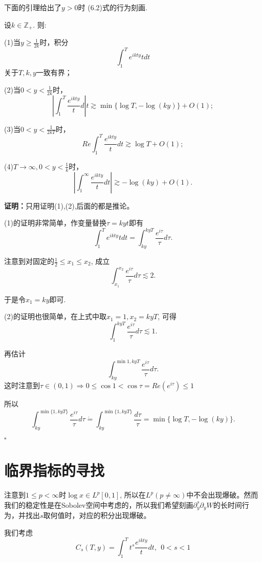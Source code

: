 下面的引理给出了$y>0$时 (6.2)式的行为刻画.

\begin{lem}
\songti\rm 设$k\in\mathbb{Z}_+$. 则:

(1)当$y\geq \frac{1}{2k}$时，积分$$\int_1^T e^{ikty}{t}dt$$关于$T,k,y$一致有界；

(2)当$0<y<\frac{1}{2k}$时，$$\left|\int_1^T\frac{e^{ikty}}{t}d\right|t\gtrsim\min\{\log T,-\log(ky)\}+O(1);$$

(3)当$0<y<\frac{1}{2kT}$时，$$Re\int_1^T\frac{e^{ikty}}{t} dt\gtrsim \log T+O(1);$$

(4)$T\rightarrow\infty,0<y<\frac{1}{k}$时，$$\left|\int_1^\infty\frac{e^{ikty}}{t}dt\right|\gtrsim-\log(ky)+O(1).$$
\end{lem}

\textbf{证明：}只用证明(1),(2),后面的都是推论。

(1)的证明非常简单，作变量替换$\tau=kyt$即有$$\int_1^T e^{ikty}{t}dt=\int_{ky}^{kyT}\frac{e^{i\tau}}{\tau}d\tau.$$

注意到对固定的$\frac{1}{2}\leq x_1\leq x_2$, 成立$$\int_{x_1}^{x_2}\frac{e^{i\tau}}{\tau}d\tau\lesssim 2.$$

于是令$x_1=ky$即可.

(2)的证明也很简单，在上式中取$x_1=1,x_2=kyT$, 可得$$\int_1^{kyT}\frac{e^{i\tau}}{\tau}d\tau\lesssim 1.$$

再估计$$\int_{ky}^{\min{1,kyT}}\frac{e^{i\tau}}{\tau}d\tau.$$这时注意到$\tau\in(0,1)\Rightarrow 0\leq\cos 1<\cos\tau=Re(e^{i\tau})\leq 1$

所以$$\int_{ky}^{\min\{1,kyT\}}\frac{e^{i\tau}}{\tau}d\tau\dot{=}\int_{ky}^{\min\{1,kyT\}}\frac{d\tau}{\tau}=\min\{\log T,-\log(ky)\}.$$

\begin{flushright}
$\square$
\end{flushright}

\section{临界指标的寻找}

注意到$1\leq p<\infty$时$\log x\in L^p[0,1]$, 所以在$L^p(p\neq\infty)$中不会出现爆破。然而我们的稳定性是在Sobolev空间中考虑的，所以我们希望刻画$\partial_y^s\partial_yW$的长时间行为，并找出$s$取何值时，对应的积分出现爆破。

我们考虑
\begin{equation}
C_s(T,y)=\int_1^Tt^s\frac{e^{ikty}}{t}dt,~~0<s<1
\end{equation}

